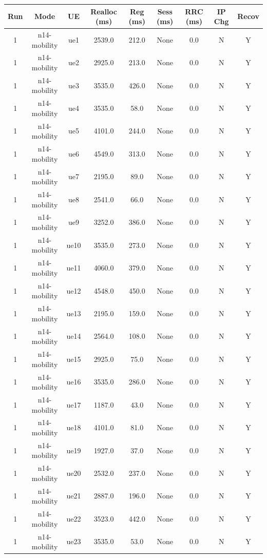 \begin{table}[ht]
\centering
\begin{tabular}{|c|c|c|c|c|c|c|c|c|}
\hline
Run & Mode & UE & Realloc (ms) & Reg (ms) & Sess (ms) & RRC (ms) & IP Chg & Recov \\
\hline
1 & n14-mobility & ue1 & 2539.0 & 212.0 & None & 0.0 & N & Y \\
1 & n14-mobility & ue2 & 2925.0 & 213.0 & None & 0.0 & N & Y \\
1 & n14-mobility & ue3 & 3535.0 & 426.0 & None & 0.0 & N & Y \\
1 & n14-mobility & ue4 & 3535.0 & 58.0 & None & 0.0 & N & Y \\
1 & n14-mobility & ue5 & 4101.0 & 244.0 & None & 0.0 & N & Y \\
1 & n14-mobility & ue6 & 4549.0 & 313.0 & None & 0.0 & N & Y \\
1 & n14-mobility & ue7 & 2195.0 & 89.0 & None & 0.0 & N & Y \\
1 & n14-mobility & ue8 & 2541.0 & 66.0 & None & 0.0 & N & Y \\
1 & n14-mobility & ue9 & 3252.0 & 386.0 & None & 0.0 & N & Y \\
1 & n14-mobility & ue10 & 3535.0 & 273.0 & None & 0.0 & N & Y \\
1 & n14-mobility & ue11 & 4060.0 & 379.0 & None & 0.0 & N & Y \\
1 & n14-mobility & ue12 & 4548.0 & 450.0 & None & 0.0 & N & Y \\
1 & n14-mobility & ue13 & 2195.0 & 159.0 & None & 0.0 & N & Y \\
1 & n14-mobility & ue14 & 2564.0 & 108.0 & None & 0.0 & N & Y \\
1 & n14-mobility & ue15 & 2925.0 & 75.0 & None & 0.0 & N & Y \\
1 & n14-mobility & ue16 & 3535.0 & 286.0 & None & 0.0 & N & Y \\
1 & n14-mobility & ue17 & 1187.0 & 43.0 & None & 0.0 & N & Y \\
1 & n14-mobility & ue18 & 4101.0 & 81.0 & None & 0.0 & N & Y \\
1 & n14-mobility & ue19 & 1927.0 & 37.0 & None & 0.0 & N & Y \\
1 & n14-mobility & ue20 & 2532.0 & 237.0 & None & 0.0 & N & Y \\
1 & n14-mobility & ue21 & 2887.0 & 196.0 & None & 0.0 & N & Y \\
1 & n14-mobility & ue22 & 3523.0 & 442.0 & None & 0.0 & N & Y \\
1 & n14-mobility & ue23 & 3535.0 & 53.0 & None & 0.0 & N & Y \\

\end{tabular}
\end{table}

